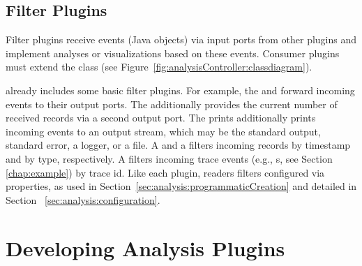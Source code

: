 \subsection{Filter Plugins}

Filter plugins receive events (Java objects) via input ports from other %
plugins and implement analyses or visualizations based on these events. %
Consumer plugins must extend the class  %
(see Figure~\ref{fig:analysisController:classdiagram}). %

\Kieker{} already includes some basic filter plugins. For example, the %
 and   forward incoming events %
to their output ports. The  additionally provides the %
current number of received records via a second output port. The  %
prints additionally prints incoming events to an output stream, which may be %
the standard output, standard error, a logger, or a file. %
A  and a  filters incoming records by %
timestamp and by type, respectively. A  filters incoming %
trace events (e.g., s, see Section~%
\ref{chap:example}) by trace id. Like each plugin, readers filters configured %
via properties, as used in Section~\ref{sec:analysis:programmaticCreation} and %
detailed in Section~%
\ref{sec:analysis:configuration}. %

%

% 


\section{Developing Analysis Plugins}\label{sec:analysis:plugins}

